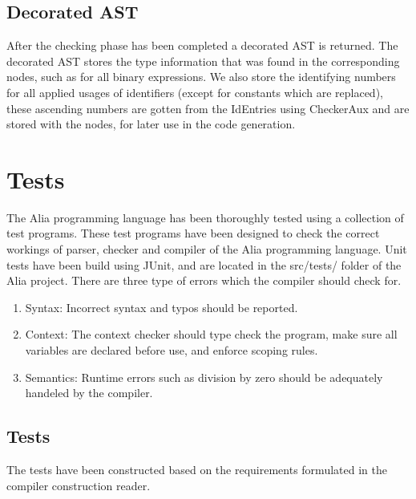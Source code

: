\documentclass[paper=a4, fontsize=11pt]{article}
\numberwithin{equation}{section}		%
\numberwithin{figure}{section}			%
\numberwithin{table}{section}				%
\begin{document}
\subsection{Decorated AST}
After the checking phase has been completed a decorated AST is returned. The decorated AST stores the type information that was found in the corresponding nodes, such as for all binary expressions. We also store the identifying numbers for all applied usages of identifiers (except for constants which are replaced), these ascending numbers are gotten from the IdEntries using CheckerAux and are stored with the nodes, for later use in the code generation.

\section{Tests}
The Alia programming language has been thoroughly tested using a collection of test programs. These test programs have been designed to check the correct workings of parser, checker and compiler of the Alia programming language. Unit tests have been build using JUnit, and are located in the src/tests/ folder of the Alia project. There are three type of errors which the compiler should check for.

\begin{enumerate}
\item Syntax: Incorrect syntax and typos should be reported.
\item Context: The context checker should type check the program, make sure all variables are declared before use, and enforce scoping rules.
\item Semantics: Runtime errors such as division by zero should be adequately handeled by the compiler.
\end{enumerate}

\subsection{Tests}
The tests have been constructed based on the requirements formulated in the compiler construction reader.
\end{document}
